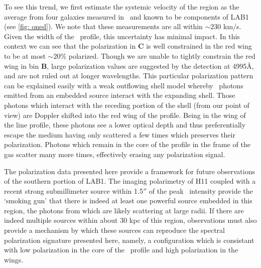 To see this trend, we first estimate the systemic velocity of the region as the average from four galaxies measured in \oiii~and known to be components of LAB1 \citep{Kubo2015, McLinden2013} (see \autoref{fig: oned}).  We note that these measurements are all within $\sim230$ km/s. Given the width of the \lya~profile, this uncertainty has minimal impact. In this context we can see that the polarization in \textbf{C} is well constrained in the red wing to be at most $\sim20\%$ polarized. Though we are unable to tightly constrain the red wing in bin \textbf{B}, large polarization values are suggested by the detection at 4995\AA, and are not ruled out at longer wavelengths.  This particular polarization pattern can be explained easily with a weak outflowing shell model whereby \lya~photons emitted from an embedded source interact with the expanding shell. Those photons which interact with the receding portion of the shell (from our point of view) are Doppler shifted into the red wing of the profile. Being in the wing of the line profile, these photons see a lower optical depth and thus preferentially escape the medium having only scattered a few times which preserves their polarization. Photons which remain in the core of the profile in the frame of the gas scatter many more times, effectively erasing any polarization signal.

The polarization data presented here provide a framework for future observations of the southern portion of LAB1. The imaging polarimetry of H11 coupled with a recent strong submillimeter source within 1.5$''$ of the peak \lya~intensity \citep{Geach2014} provide the `smoking gun' that there is indeed at least one powerful source embedded in this region, the photons from which are likely scattering at large radii. If there are indeed multiple  sources within about 30 kpc of this region, observations must also provide a mechanism by which these sources can reproduce the spectral polarization signature presented here, namely, a configuration which is consistant with low polarization in the core of the \lya~profile and high polarization in the wings.

